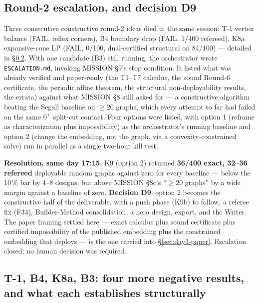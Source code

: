 \documentclass[10pt,a4paper]{article}
\newcommand{\fn}[1]{\nolinkurl{#1}}
\begin{document}
\subsection{Round-2 escalation, and decision D9}

Three consecutive constructive round-2 ideas died in the same session: T-1 vertex balance
(FAIL, reflex corners), B4 boundary drop (FAIL, 1/400 refereed), K8a expansive-cone LP (FAIL,
0/100, dual-certified structural on 84/100) --- detailed in \S\ref{sec:day3-round2}. With one
candidate (B3) still running, the orchestrator wrote \fn{ESCALATION.md}, invoking MISSION \S9's
stop condition. It listed what was already verified and paper-ready (the T1--T7 calculus, the
sound Round-6 certificate, the periodic affine theorem, the structural non-deployability results,
the errata) against what MISSION \S8 still asked for --- a constructive algorithm beating the
Segall baseline on $\ge20$ graphs, which every attempt so far had failed on the same $0^+$
split-cut contact. Four options were listed, with option 1 (reframe as characterization plus
impossibility) as the orchestrator's running baseline and option 2 (change the embedding, not the
graph, via a convexity-constrained solve) run in parallel as a single two-hour kill test.

\textbf{Resolution, same day 17:15.} K9 (option 2) returned \textbf{36/400 exact, 32--36
refereed} deployable random graphs against zero for every baseline --- below the 10\,\% bar by
4--8 designs, but above MISSION \S8c's ``$\ge20$ graphs'' by a wide margin against a baseline of
zero. \textbf{Decision D9}: option 2 becomes the constructive half of the deliverable, with a
push phase (K9b) to follow, a referee fix (F34), Builder-Method consolidation, a hero design,
export, and the Writer. The paper framing settled here --- exact calculus plus sound certificate
plus certified impossibility of the published embedding plus the constrained embedding that
deploys --- is the one carried into \S\ref{sec:day3-paper}. Escalation closed; no human decision
was required.

\subsection{T-1, B4, K8a, B3: four more negative results, and what each establishes structurally}
\label{sec:day3-round2}
\end{document}
